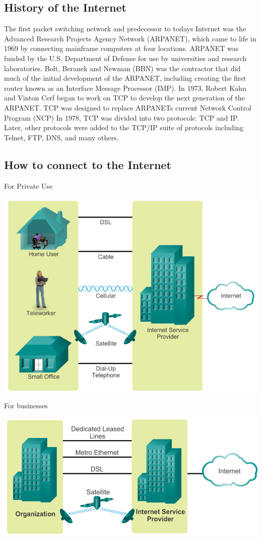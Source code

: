 \documentclass[11pt]{article}
\begin{document}
\subsection{History of the Internet}
The first packet switching network and predecessor to todays Internet was the Advanced Research Projects Agency Network (ARPANET), 
which came to life in 1969 by connecting mainframe computers at four locations.
ARPANET was funded by the U.S. Department of Defense for use by universities and research laboratories. 
Bolt, Beranek and Newman (BBN) was the contractor that did much of the initial development of the ARPANET, including creating the first router known as an Interface Message Processor (IMP).
In 1973, Robert Kahn and Vinton Cerf began to work on TCP to develop the next generation of the ARPANET.\@
TCP was designed to replace ARPANETs current Network Control Program (NCP)
In 1978, TCP was divided into two protocols: TCP and IP.\@
Later, other protocols were added to the
TCP/IP suite of protocols including Telnet, FTP, DNS, and many others.
\subsection{How to connect to the Internet}
For Private Use

\includegraphics[width=\textwidth]{connect-internet-private-use}

For businesses

\includegraphics[width=\textwidth]{connect-internet-business-use}
\end{document}
